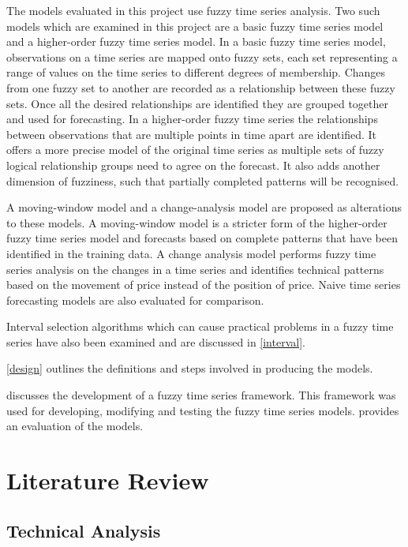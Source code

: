\documentclass[12pt, oneside, a4paper]{article}
\theoremstyle{definition}
\begin{document}
The models evaluated in this project use fuzzy time series analysis. Two such models which are examined in this project are a basic fuzzy time series model and a higher-order fuzzy time series model. In a basic fuzzy time series model, observations on a time series are mapped onto fuzzy sets, each set representing a range of values on the time series to different degrees of membership. Changes from one fuzzy set to another are recorded as a relationship between these fuzzy sets. Once all the desired relationships are identified they are grouped together and used for forecasting. In a higher-order fuzzy time series the relationships between observations that are multiple points in time apart are identified. It offers a more precise model of the original time series as multiple sets of fuzzy logical relationship groups need to agree on the forecast. It also adds another dimension of fuzziness, such that partially completed patterns will be recognised. 

A moving-window model and a change-analysis model are proposed as alterations to these models. A moving-window model is a stricter form of the higher-order fuzzy time series model and forecasts based on complete patterns that have been identified in the training data. A change analysis model performs fuzzy time series analysis on the changes in a time series and identifies technical patterns based on the movement of price instead of the position of price. Naive time series forecasting models are also evaluated for comparison. 

Interval selection algorithms which can cause practical problems in a fuzzy time series have also been examined and are discussed in \cref{interval}.

\cref{design} outlines the definitions and steps involved in producing the models.

 discusses the development of a fuzzy time series framework. This framework was used for developing, modifying and testing the fuzzy time series models.  provides an evaluation of the models.

\section{Literature Review}

\subsection{Technical Analysis}
\label{ta}
\end{document}
